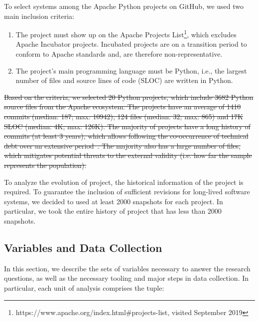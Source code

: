 \documentclass[sigconf,review]{acmart}
\begin{document}
To select systems among the Apache Python projects on GitHub, we used two main inclusion criteria:
\begin{enumerate}
    \item 
    The project must show up on the Apache Projects List\footnote{https://www.apache.org/index.html\#projects-list, visited September 2019}, which excludes Apache Incubator projects. Incubated projects are on a transition period to conform to Apache standards and, are therefore  non-representative.
    
    \item  The project's main programming language must be Python, i.e., the largest number of files and source lines of code (SLOC) are written in Python.

\end{enumerate}

\sout{Based on the criteria, we selected 20 Python projects, which include 3682 Python source files from the Apache ecosystem. The projects have an average of 1410 commits (median: 187; max: 10942), 124 files (median: 32; max: 865) and 17K SLOC (median: 4K; max: 126K). The majority of projects have a long history of commits (at least 3 years), which allows following the co-occurrence of technical debt over an extensive period~\cite{Marinescu2012}. The majority also has a large number of files, which mitigates potential threats to the external validity (i.e. how far the sample represents the population). }

To analyze the evolution of project, the historical information of the project is required. To guarantee the inclusion of sufficient revisions for long-lived software systems, we decided to used at least 2000 snapshots for each project. In particular, we took the entire history of project that has less than 2000 snapshots.
\subsection{Variables and Data Collection}\label{sec:variables}

In this section, we describe the sets of variables necessary to answer the research questions, as well as the necessary tooling and major steps in data collection. In particular, each unit of analysis comprises the tuple:
\end{document}
